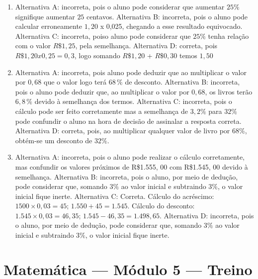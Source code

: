 \begin{enumerate}
\item Alternativa A: incorreta, pois o aluno pode considerar que aumentar $25\%$
signifique aumentar $25$ centavos.
Alternativa B: incorreta, pois o aluno pode calcular erroneamente $1,20$ x
0,025, chegando a esse resultado equivocado.
Alternativa C: incorreta, poiso aluno pode considerar que $25\%$ tenha
relação com o valor $R\$1,25$, pela semelhança.
Alternativa D: correta, pois $R\$1,20 x 0,25 = 0,3$, logo somando $R\$1,20$
+ $R\$0,30$ temos $1,50$
\item Alternativa A: incorreta, pois aluno pode deduzir que ao multiplicar o
valor por $0,68$ que o valor logo terá $68\,\%$ de desconto.
Alternativa B: incorreta, pois o aluno pode deduzir que, ao multiplicar
o valor por $0,68$, os livros terão $6,8\,\%$ devido à semelhança dos termos.
Alternativa C: incorreta, pois o cálculo pode ser feito corretamente mas
a semelhança de $3,2\%$ para $32\%$ pode confundir o aluno na hora de
decisão de assinalar a resposta correta.
Alternativa D: correta, pois, ao multiplicar qualquer valor de livro por
68\%, obtém-se um desconto de $32\%$.
\item Alternativa A: incorreta, pois o aluno pode realizar o cálculo
corretamente, mas confundir os valores próximos de R\$1.555, $00$ com
R\$1.545, $00$ devido à semelhança.
Alternativa B: incorreta, pois o aluno, por meio de dedução, pode
considerar que, somando $3\%$ ao valor inicial e subtraindo $3\%$, o valor
inicial fique inerte.
Alternativa C: Correta. Cálculo do acréscimo: $1500\times 0,03 = 45$; $1.550 + 45 = 1.545$. Cálculo do desconto: $1.545\times 0,03 = 46,35$; $1.545 - 46,35 = 1.498,65$.
Alternativa D: incorreta, pois o aluno, por meio de dedução, pode
considerar que, somando $3\%$ ao valor inicial e subtraindo $3\%$, o valor
inicial fique inerte.
\end{enumerate}

\section*{Matemática — Módulo 5 — Treino}

